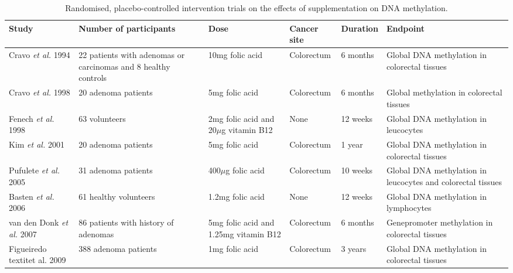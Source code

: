\begin{sidewaystable}[h]
\caption{Randomised, placebo-controlled intervention trials on the effects of supplementation on DNA methylation.} 
\label{table2_1} 
  \begin{adjustbox}{width=18cm}
  \begin{tabular}{L{2.8cm}C{3.358cm}C{2.04cm}C{2.83cm}C{2.303cm}C{3.093cm}} 
  \hline 
  \bfseries Study & \bfseries Number of participants & \bfseries Dose & \bfseries Cancer site & \bfseries Duration & \bfseries Endpoint\\
  \hline 
  Cravo \textit{et al.} 1994 \cite{c253} &  22 patients with adenomas or carcinomas and 8 healthy controls &  10mg folic acid & Colorectum & 6 months &  Global DNA methylation in colorectal tissues\\ 
  \hline 
  Cravo \textit{et al.} 1998 \cite{c254} &  20 adenoma patients &  5mg folic acid &  Colorectum &  6 months &  Global methylation in colorectal tissues\\
  \hline 
  Fenech \textit{et al.} 1998 \cite{c252} &  63 volunteers &  2mg folic acid and 20\textrm{${\mu}$}g vitamin B12 &  None &  12 weeks &  Global DNA methylation in leucocytes\\
  \hline 
  Kim \textit{et al.} 2001 \cite{c255} &  20 adenoma patients &  5mg folic acid &  Colorectum &  1 year &  Global DNA methylation in colorectal tissues\\
  \hline 
  Pufulete \textit{et al.} 2005 \cite{c256} &  31 adenoma patients &  400\textrm{${\mu}$}g folic acid &  Colorectum &  10 weeks &  Global DNA methylation in leucocytes and colorectal tissues \\
  \hline 
  Basten \textit{et al.} 2006 \cite{c251} &  61 healthy volunteers &  1.2mg folic acid &  None &  12 weeks &  Global DNA methylation in lymphocytes\\
  \hline 
  van den Donk \textit{et al.} 2007 \cite{c258} &  86 patients with history of adenomas &  5mg folic acid and 1.25mg vitamin B12 &  Colorectum &  6 months &  Genepromoter methylation in colorectal tissues \\ 
  \hline 
  Figueiredo textit{et al}. 2009 \cite{c257} &  388 adenoma patients &  1mg folic acid &  Colorectum &  3 years &  Global DNA methylation in colorectal tissues\\
  \hline
  \end{tabular}
  \end{adjustbox}
\end{sidewaystable}

 
